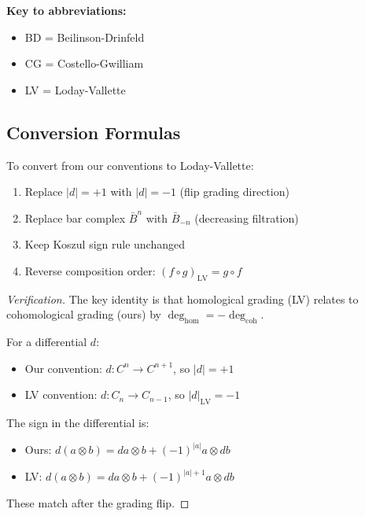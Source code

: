\textbf{Key to abbreviations:}
\begin{itemize}
\item BD = Beilinson-Drinfeld \cite{BD04}
\item CG = Costello-Gwilliam \cite{CG17}
\item LV = Loday-Vallette \cite{LV12}
\end{itemize}

\subsection{Conversion Formulas}

\begin{proposition}\label{prop:LV-conversion-complete}
To convert from our conventions to Loday-Vallette:
\begin{enumerate}
\item Replace $|d| = +1$ with $|d| = -1$ (flip grading direction)
\item Replace bar complex $\bar{B}^n$ with $\bar{B}_{-n}$ (decreasing filtration)
\item Keep Koszul sign rule unchanged
\item Reverse composition order: $(f \circ g)_{\text{LV}} = g \circ f$
\end{enumerate}
\end{proposition}

\begin{proof}[Verification]
The key identity is that homological grading (LV) relates to cohomological grading 
(ours) by $\deg_{\text{hom}} = -\deg_{\text{coh}}$.

For a differential $d$:
\begin{itemize}
\item Our convention: $d: C^n \to C^{n+1}$, so $|d| = +1$
\item LV convention: $d: C_n \to C_{n-1}$, so $|d|_{\text{LV}} = -1$
\end{itemize}

The sign in the differential is:
\begin{itemize}
\item Ours: $d(a \otimes b) = da \otimes b + (-1)^{|a|} a \otimes db$
\item LV: $d(a \otimes b) = da \otimes b + (-1)^{|a|+1} a \otimes db$
\end{itemize}

These match after the grading flip.
\end{proof}

